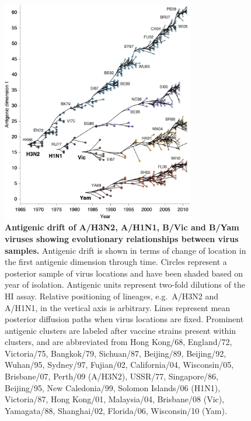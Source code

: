 \documentclass[11pt,oneside,letterpaper]{article}
\begin{document}
\begin{figure}[h]
	\centering		
	\includegraphics[width=0.75\textwidth]{figures/drift}
	\caption{\textbf{Antigenic drift of A/H3N2, A/H1N1, B/Vic and B/Yam viruses showing evolutionary relationships between virus samples.} 
	Antigenic drift is shown in terms of change of location in the first antigenic dimension through time.
	Circles represent a posterior sample of virus locations and have been shaded based on year of isolation.
	Antigenic units represent two-fold dilutions of the HI assay.
	Relative positioning of lineages, e.g.\ A/H3N2 and A/H1N1, in the vertical axis is arbitrary.
	Lines represent mean posterior diffusion paths when virus locations are fixed.
	Prominent antigenic clusters are labeled after vaccine strains present within clusters, and are abbreviated from Hong Kong/68, England/72, Victoria/75, Bangkok/79, Sichuan/87, Beijing/89, Beijing/92, Wuhan/95, Sydney/97, Fujian/02, California/04, Wisconsin/05, Brisbane/07, Perth/09 (A/H3N2), USSR/77, Singapore/86, Beijing/95, New Caledonia/99, Solomon Islands/06 (H1N1), Victoria/87, Hong Kong/01, Malaysia/04, Brisbane/08 (Vic), Yamagata/88, Shanghai/02, Florida/06, Wisconsin/10 (Yam).} 
	\label{drift} 
\end{figure}
\end{document}
